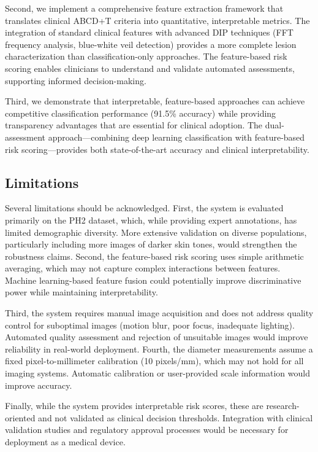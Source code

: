 \documentclass[conference]{IEEEtran}
\begin{document}
Second, we implement a comprehensive feature extraction framework that translates clinical ABCD+T criteria into quantitative, interpretable metrics. The integration of standard clinical features with advanced DIP techniques (FFT frequency analysis, blue-white veil detection) provides a more complete lesion characterization than classification-only approaches. The feature-based risk scoring enables clinicians to understand and validate automated assessments, supporting informed decision-making.

Third, we demonstrate that interpretable, feature-based approaches can achieve competitive classification performance (91.5\% accuracy) while providing transparency advantages that are essential for clinical adoption. The dual-assessment approach—combining deep learning classification with feature-based risk scoring—provides both state-of-the-art accuracy and clinical interpretability.

\subsection{Limitations}

Several limitations should be acknowledged. First, the system is evaluated primarily on the PH2 dataset, which, while providing expert annotations, has limited demographic diversity. More extensive validation on diverse populations, particularly including more images of darker skin tones, would strengthen the robustness claims. Second, the feature-based risk scoring uses simple arithmetic averaging, which may not capture complex interactions between features. Machine learning-based feature fusion could potentially improve discriminative power while maintaining interpretability.

Third, the system requires manual image acquisition and does not address quality control for suboptimal images (motion blur, poor focus, inadequate lighting). Automated quality assessment and rejection of unsuitable images would improve reliability in real-world deployment. Fourth, the diameter measurements assume a fixed pixel-to-millimeter calibration (10 pixels/mm), which may not hold for all imaging systems. Automatic calibration or user-provided scale information would improve accuracy.

Finally, while the system provides interpretable risk scores, these are research-oriented and not validated as clinical decision thresholds. Integration with clinical validation studies and regulatory approval processes would be necessary for deployment as a medical device.
\end{document}
